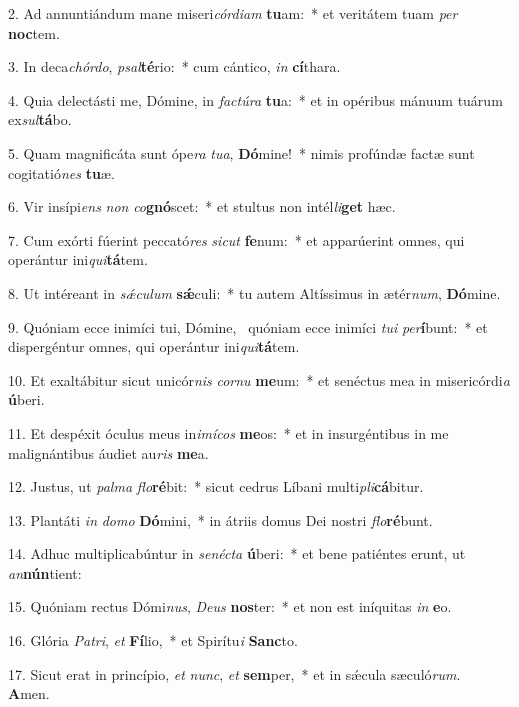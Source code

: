 2. Ad annuntiándum mane miseri\textit{cór}\textit{di}\textit{am} \textbf{tu}am:~*  et veritátem tuam \textit{per} \textbf{noc}tem.\

3. In deca\textit{chór}\textit{do}, \textit{psal}\textbf{té}rio:~*  cum cántico, \textit{in} \textbf{cí}thara.\

4. Quia delectásti me, Dómine, in \textit{fac}\textit{tú}\textit{ra} \textbf{tu}a:~*  et in opéribus mánuum tuárum ex\textit{sul}\textbf{tá}bo.\

5. Quam magnificáta sunt ópe\textit{ra} \textit{tu}\textit{a}, \textbf{Dó}mine!~*  nimis profúndæ factæ sunt cogitatió\textit{nes} \textbf{tu}æ.\

6. Vir insípi\textit{ens} \textit{non} \textit{co}\textbf{gnó}scet:~*  et stultus non intél\textit{li}\textbf{get} hæc.\

7. Cum exórti fúerint peccató\textit{res} \textit{sic}\textit{ut} \textbf{fe}num:~*  et apparúerint omnes, qui operántur ini\textit{qui}\textbf{tá}tem.\

8. Ut intéreant in \textit{sǽ}\textit{cu}\textit{lum} \textbf{sǽ}culi:~*  tu autem Altíssimus in ætér\textit{num}, \textbf{Dó}mine.\

9. Quóniam ecce inimíci tui, Dómine, \dag\  quóniam ecce inimíci \textit{tu}\textit{i} \textit{per}\textbf{í}bunt:~*  et dispergéntur omnes, qui operántur ini\textit{qui}\textbf{tá}tem.\

10. Et exaltábitur sicut unicór\textit{nis} \textit{cor}\textit{nu} \textbf{me}um:~*  et senéctus mea in misericórdi\textit{a} \textbf{ú}beri.\

11. Et despéxit óculus meus in\textit{i}\textit{mí}\textit{cos} \textbf{me}os:~*  et in insurgéntibus in me malignántibus áudiet au\textit{ris} \textbf{me}a.\

12. Justus, ut \textit{pal}\textit{ma} \textit{flo}\textbf{ré}bit:~*  sicut cedrus Líbani multi\textit{pli}\textbf{cá}bitur.\

13. Plantáti \textit{in} \textit{do}\textit{mo} \textbf{Dó}mini,~*  in átriis domus Dei nostri \textit{flo}\textbf{ré}bunt.\

14. Adhuc multiplicabúntur in \textit{se}\textit{néc}\textit{ta} \textbf{ú}beri:~*  et bene patiéntes erunt, ut \textit{an}\textbf{nún}tient:\

15. Quóniam rectus Dómi\textit{nus}, \textit{De}\textit{us} \textbf{nos}ter:~*  et non est iníquitas \textit{in} \textbf{e}o.\

16. Glória \textit{Pa}\textit{tri}, \textit{et} \textbf{Fí}lio,~*  et Spirítu\textit{i} \textbf{Sanc}to.\

17. Sicut erat in princípio, \textit{et} \textit{nunc}, \textit{et} \textbf{sem}per,~*  et in sǽcula sæculó\textit{rum}. \textbf{A}men.\

